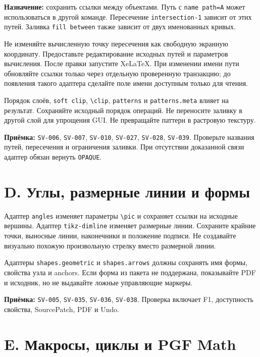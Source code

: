 \documentclass[11pt,a4paper,oneside]{scrreprt}
\begin{document}
\textbf{Назначение:} сохранить ссылки между объектами. Путь с \texttt{name\ path=A} может использоваться в другой команде. Пересечение \texttt{intersection-1} зависит от этих путей. Заливка \texttt{fill\ between} также зависит от двух именованных кривых.

Не изменяйте вычисленную точку пересечения как свободную экранную координату. Предоставьте редактирование исходных путей и параметров вычисления. После правки запустите XeLaTeX. При изменении имени пути обновляйте ссылки только через отдельную проверенную транзакцию; до появления такого адаптера сделайте поле имени доступным только для чтения.

Порядок слоёв, \texttt{soft\ clip}, \texttt{\textbackslash{}clip}, \texttt{patterns} и \texttt{patterns.meta} влияет на результат. Сохраняйте исходный порядок операций. Не переносите заливку в другой слой для упрощения GUI. Не превращайте паттерн в растровую текстуру.

\textbf{Приёмка:} \texttt{SV-006}, \texttt{SV-007}, \texttt{SV-010}, \texttt{SV-027}, \texttt{SV-028}, \texttt{SV-039}. Проверьте названия путей, пересечения и ограничения заливки. При отсутствии доказанной связи адаптер обязан вернуть \texttt{OPAQUE}.

\section{D. Углы, размерные линии и формы}\label{d.-ux443ux433ux43bux44b-ux440ux430ux437ux43cux435ux440ux43dux44bux435-ux43bux438ux43dux438ux438-ux438-ux444ux43eux440ux43cux44b}

Адаптер \texttt{angles} изменяет параметры \texttt{\textbackslash{}pic} и сохраняет ссылки на исходные вершины. Адаптер \texttt{tikz-dimline} изменяет размерные линии. Сохраните крайние точки, выносные линии, наконечники и положение подписи. Не создавайте визуально похожую произвольную стрелку вместо размерной линии.

Адаптеры \texttt{shapes.geometric} и \texttt{shapes.arrows} должны сохранять имя формы, свойства узла и anchors. Если форма из пакета не поддержана, показывайте PDF и исходник, но не выдавайте ложные управляющие маркеры.

\textbf{Приёмка:} \texttt{SV-005}, \texttt{SV-035}, \texttt{SV-036}, \texttt{SV-038}. Проверка включает F1, доступность свойства, SourcePatch, PDF и Undo.

\section{E. Макросы, циклы и PGF Math}\label{e.-ux43cux430ux43aux440ux43eux441ux44b-ux446ux438ux43aux43bux44b-ux438-pgf-math}
\end{document}
